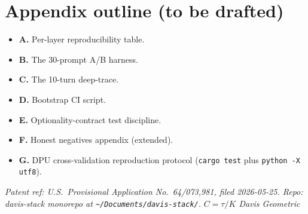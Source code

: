\documentclass[11pt,letterpaper]{article}
\begin{document}
\appendix
\section*{Appendix outline (to be drafted)}

\begin{itemize}[nosep]
\item \textbf{A.} Per-layer reproducibility table.
\item \textbf{B.} The 30-prompt A/B harness.
\item \textbf{C.} The 10-turn deep-trace.
\item \textbf{D.} Bootstrap CI script.
\item \textbf{E.} Optionality-contract test discipline.
\item \textbf{F.} Honest negatives appendix (extended).
\item \textbf{G.} DPU cross-validation reproduction protocol
  (\verb|cargo test| plus \verb|python -X utf8|).
\end{itemize}


\bigskip
\bigskip

\noindent\textit{Patent ref: U.S.\ Provisional Application
No.~64/073,981, filed 2026-05-25. Repo: davis-stack monorepo at
\texttt{\textasciitilde/Documents/davis-stack/}.}
\hfill\emph{$C = \tau / K$ \quad Davis Geometric }
\end{document}
